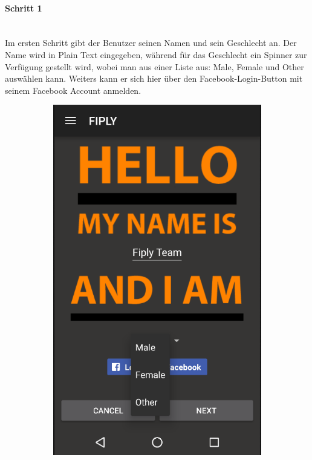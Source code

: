 \documentclass[FIPLY_base.tex]{subfiles}
\begin{document}
\paragraph{Schritt 1}\ \\
Im ersten Schritt gibt der Benutzer seinen Namen und sein Geschlecht an.
Der Name wird in Plain Text eingegeben, während für das Geschlecht ein Spinner zur Verfügung gestellt wird, wobei man aus einer Liste aus: Male, Female und Other auswählen kann.
Weiters kann er sich hier über den Facebook-Login-Button mit seinem Facebook Account anmelden.
\begin{figure}[H]
	\begin{subfigure}[b]{0.3\textwidth}
	\includegraphics[scale=0.55]{img/User_step1}

\end{subfigure}
\end{figure}
\end{document}
